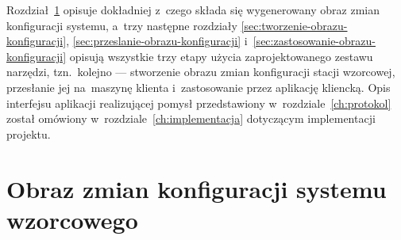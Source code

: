 \documentclass[thesis]{subfiles}
\begin{document}
Rozdział~\ref{sec:obraz-zmian-konfiguracji} opisuje dokładniej z~czego składa się wygenerowany obraz zmian konfiguracji systemu, a~trzy następne rozdziały \ref{sec:tworzenie-obrazu-konfiguracji}, \ref{sec:przeslanie-obrazu-konfiguracji} i~\ref{sec:zastosowanie-obrazu-konfiguracji} opisują wszystkie trzy etapy użycia zaprojektowanego zestawu narzędzi, tzn.~kolejno --- stworzenie obrazu zmian konfiguracji stacji wzorcowej, przesłanie jej na~maszynę klienta i~zastosowanie przez aplikację kliencką. Opis interfejsu aplikacji realizującej pomysł przedstawiony w~rozdziale~\ref{ch:protokol} został omówiony w~rozdziale~\ref{ch:implementacja} dotyczącym implementacji projektu.


\section{Obraz zmian konfiguracji systemu wzorcowego}
\label{sec:obraz-zmian-konfiguracji}
\end{document}
